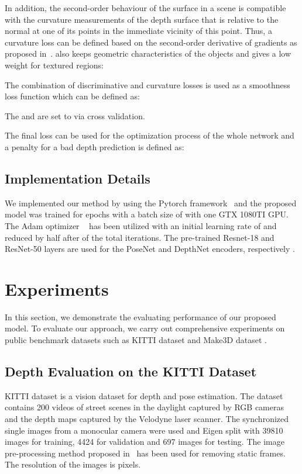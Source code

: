 \documentclass[journal]{IEEEtran}
\begin{document}
In addition, the second-order behaviour of the surface in a scene is compatible with the curvature measurements of the depth surface that is relative to the normal at one of its points in the immediate vicinity of this point. Thus, a curvature loss  can be defined based on the second-order derivative of gradients as proposed in~\cite{Shu2020}.  also keeps geometric characteristics of the objects and gives a low weight for textured regions:


The combination of discriminative and curvature losses is used as a smoothness loss function which can be defined as:

The  and  are set to  via cross validation. 

The final loss can be used for the optimization process of the whole network and a penalty for a bad depth prediction is defined as:


\subsection{Implementation Details}
We implemented our method by using the Pytorch framework~\cite{Paszke} and the proposed model was trained for  epochs with a batch size of  with one GTX 1080TI GPU. The Adam optimizer ~\cite{Kingma2015} has been utilized with an initial learning rate of  and reduced by half after  of the total iterations. The pre-trained Resnet-18 and ResNet-50 layers are used for the PoseNet and DepthNet encoders, respectively \cite{Tan2019}. 
\section{Experiments}
In this section, we demonstrate the evaluating performance of our proposed model. To evaluate our approach, we carry out comprehensive experiments on public benchmark datasets such as KITTI dataset \cite{Geiger2012} and Make3D dataset \cite{Saxena2009}. 

\subsection{Depth Evaluation on the KITTI Dataset}
KITTI dataset is a vision dataset for depth and pose estimation. The dataset contains 200 videos of street scenes in the daylight captured by RGB cameras and the depth maps captured by the Velodyne laser scanner. The synchronized single images from a monocular camera were used and Eigen split \cite{Eigen2015} with 39810 images for training, 4424 for validation and 697 images for testing. The image pre-processing method proposed in~\cite{Zhou2017} has been used for removing static frames. The resolution of the images is  pixels.
\end{document}
